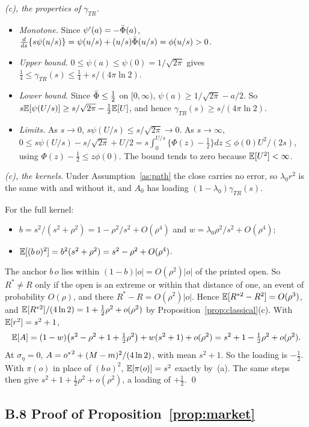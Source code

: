 \emph{(c), the properties of $\gamma_{TR}$.}
\begin{itemize}
  \item \emph{Monotone.} Since $\psi'(a)=-\bar\Phi(a)$,
        $\tfrac{d}{ds}\{s\psi(u/s)\}=\psi(u/s)+(u/s)\bar\Phi(u/s)=\phi(u/s)>0$.
  \item \emph{Upper bound.} $0\le\psi(a)\le\psi(0)=1/\sqrt{2\pi}$ gives
        $\tfrac14\le\gamma_{TR}(s)\le\tfrac14+s/(4\pi\ln2)$.
  \item \emph{Lower bound.} Since $\bar\Phi\le\tfrac12$ on $[0,\infty)$,
        $\psi(a)\ge1/\sqrt{2\pi}-a/2$. So $s\mathbb{E}[\psi(U/s)]\ge s/\sqrt{2\pi}-\tfrac12\mathbb{E}[U]$, and hence
        $\gamma_{TR}(s)\ge s/(4\pi\ln2)$.
  \item \emph{Limits.} As $s\to0$, $s\psi(U/s)\le s/\sqrt{2\pi}\to0$. As $s\to\infty$,
        $0\le s\psi(U/s)-s/\sqrt{2\pi}+U/2=s\int_0^{U/s}\{\Phi(z)-\tfrac12\}dz\le\phi(0)U^2/(2s)$,
        using $\Phi(z)-\tfrac12\le z\phi(0)$. The bound tends to zero because $\mathbb{E}[U^2]<\infty$.
\end{itemize}

\emph{(c), the kernels.} Under Assumption~\ref{as:path} the close carries no error, so $\lambda_0r^2$
is the same with and without it, and $A_0$ has loading $(1-\lambda_0)\gamma_{TR}(s)$.

For the full kernel:
\begin{itemize}
  \item $b=s^2/(s^2+\rho^2)=1-\rho^2/s^2+O(\rho^4)$ and $w=\lambda_0\rho^2/s^2+O(\rho^4)$;
  \item $\mathbb{E}[(b\,o)^2]=b^2(s^2+\rho^2)=s^2-\rho^2+O(\rho^4)$.
\end{itemize}
The anchor $b\,o$ lies within $(1-b)|o|=O(\rho^2)|o|$ of the printed open. So $R^*\neq R$ only if the
open is an extreme or within that distance of one, an event of probability $O(\rho)$, and there
$R^*-R=O(\rho^2)|o|$. Hence $\mathbb{E}[R^{*2}-R^2]=O(\rho^3)$, and $\mathbb{E}[R^{*2}]/(4\ln2)=1+\tfrac12\rho^2+o(\rho^2)$
by Proposition~\ref{prop:classical}(c). With $\mathbb{E}[r^2]=s^2+1$,
\[
  \mathbb{E}[A]=(1-w)\bigl(s^2-\rho^2+1+\tfrac12\rho^2\bigr)+w(s^2+1)+o(\rho^2)=s^2+1-\tfrac12\rho^2+o(\rho^2).
\]
At $\sigma_\eta=0$, $A={o^{*}}^2+(M-m)^2/(4\ln2)$, with mean $s^2+1$. So the loading is $-\tfrac12$. With
$\pi(o)$ in place of $(b\,o)^2$, $\mathbb{E}[\pi(o)]=s^2$ exactly by~(a). The same steps then give
$s^2+1+\tfrac12\rho^2+o(\rho^2)$, a loading of $+\tfrac12$. \qed

\subsection*{B.8 Proof of Proposition~\ref{prop:market}}


